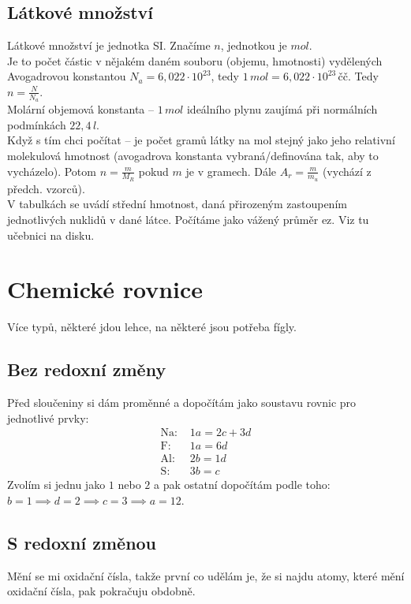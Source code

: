 \documentclass{article}
\begin{document}
\subsection{Látkové množství}
Látkové množství je jednotka SI. Značíme $n$, jednotkou je $mol$.\\
Je to počet částic v nějakém daném souboru (objemu, hmotnosti) vydělených Avogadrovou konstantou $N_a = 6,022 \cdot 10^{23}$, tedy $1 \, mol = 6,022 \cdot 10^{23} \, \text{čč}$. Tedy $n = \frac{N}{N_a}$.\\
Molární objemová konstanta -- $1 \, mol$ ideálního plynu zaujímá při normálních podmínkách $22,4 \, l$.\\
Když s tím chci počítat --  je počet gramů látky na mol stejný jako jeho relativní molekulová hmotnost (avogadrova konstanta vybraná/definována tak, aby to vycházelo). Potom $n = \frac{m}{M_R}$ pokud $m$ je v gramech. Dále $A_r = \frac{m}{m_u}$ (vychází z předch. vzorců).\\
V tabulkách se uvádí střední hmotnost, daná přirozeným zastoupením jednotlivých nuklidů v dané látce. Počítáme jako vážený průměr ez. Viz tu učebnici na disku.

\section{Chemické rovnice}
Více typů, některé jdou lehce, na některé jsou potřeba fígly.

\subsection{Bez redoxní změny}
Před sloučeniny si dám proměnné a dopočítám jako soustavu rovnic pro jednotlivé prvky: 
\begin{align*}
  \text{Na: } &1a = 2c + 3d\\
  \text{F: } &1a = 6d\\
  \text{Al: } &2b = 1d\\
  \text{S: } &3b = c
\end{align*}
Zvolím si jednu jako $1$ nebo $2$ a pak ostatní dopočítám podle toho: $b=1 \implies d = 2 \implies c = 3 \implies a = 12$.

\subsection{S redoxní změnou}
Mění se mi oxidační čísla, takže první co udělám je, že si najdu atomy, které mění oxidační čísla, pak pokračuju obdobně.
\end{document}
